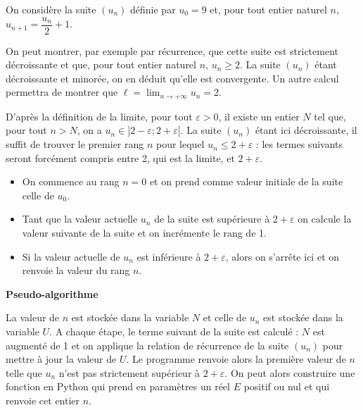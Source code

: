 \documentclass[11pt,fleqn, openany]{book} %
\begin{document}
\begin{example}On considère la suite $(u_n)$ définie par $u_0=9$ et, pour tout entier naturel $n$, $u_{n+1}=\dfrac{u_n}{2}+1$.

On peut montrer, par exemple par récurrence, que cette suite est strictement décroissante et que, pour tout entier naturel $n$, $u_n \geqslant 2$. La suite $(u_n)$ étant décroissante et minorée, on en déduit qu'elle est convergente. Un autre calcul permettra de montrer que $\ell = \displaystyle \lim_{n \to +\infty} u_n=2$.

D'après la définition de la limite, pour tout $\varepsilon >0$, il existe un entier $N$ tel que, pour tout $n>N$, on a $u_n \in ]2-\varepsilon ; 2+\varepsilon [$. La suite $(u_n)$ étant ici décroissante, il suffit de trouver le premier rang $n$ pour lequel $u_n \leqslant 2+\varepsilon$ : les termes suivants seront forcément compris entre 2, qui est la limite, et $2+\varepsilon$.

\begin{itemize}
\item On commence au rang $n=0$ et on prend comme valeur initiale de la suite celle de $u_0$.
\item Tant que la valeur actuelle $u_n$ de la suite est supérieure à $2+\varepsilon$ on calcule la valeur suivante de la suite et on incrémente le rang de 1.
\item Si la valeur actuelle de $u_n$ est inférieure à $2+\varepsilon$, alors on s'arrête ici et on renvoie la valeur du rang $n$.
\end{itemize}

\textbf{Pseudo-algorithme}

\begin{center}
\end{center}

La valeur de $n$ est stockée dans la variable $N$ et celle de $u_n$ est stockée dans la variable $U$. A chaque étape, le terme suivant de la suite est calculé : $N$ est augmenté de 1 et on applique la relation de récurrence de la suite $(u_n)$ pour mettre à jour la valeur de $U$. Le programme renvoie alors la première valeur de $n$ telle que $u_n$ n'est pas strictement supérieur à $2+\varepsilon$. On peut alors construire une fonction en Python qui prend en paramètres un réel $E$ positif ou nul et qui renvoie cet entier $n$.


\end{example}
\end{document}
